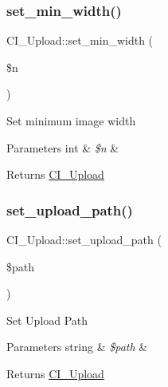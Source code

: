 \subsubsection{\texorpdfstring{set\+\_\+min\+\_\+width()}{set\_min\_width()}}
{\footnotesize\ttfamily C\+I\+\_\+\+Upload\+::set\+\_\+min\+\_\+width (\begin{DoxyParamCaption}\item[{}]{\$n }\end{DoxyParamCaption})}

Set minimum image width


\begin{DoxyParams}[1]{Parameters}
int & {\em \$n} & \\
\hline
\end{DoxyParams}
\begin{DoxyReturn}{Returns}
\mbox{\hyperlink{class_c_i___upload}{C\+I\+\_\+\+Upload}} 
\end{DoxyReturn}
\mbox{\label{class_c_i___upload_a375727ece6d87a17328fd19ba3e8f4f0}} 
\subsubsection{\texorpdfstring{set\+\_\+upload\+\_\+path()}{set\_upload\_path()}}
{\footnotesize\ttfamily C\+I\+\_\+\+Upload\+::set\+\_\+upload\+\_\+path (\begin{DoxyParamCaption}\item[{}]{\$path }\end{DoxyParamCaption})}

Set Upload Path


\begin{DoxyParams}[1]{Parameters}
string & {\em \$path} & \\
\hline
\end{DoxyParams}
\begin{DoxyReturn}{Returns}
\mbox{\hyperlink{class_c_i___upload}{C\+I\+\_\+\+Upload}} 
\end{DoxyReturn}
\mbox{\label{class_c_i___upload_aa0fdcdc09ee414866516aea622bfa4d8}} 
